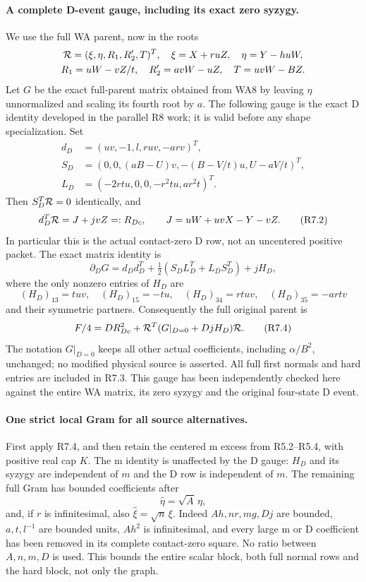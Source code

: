 \paragraph{A complete D-event gauge, including its exact zero syzygy.}
We use the full WA parent, now in the roots
\[
\begin{gathered}
 {\cal R}=(\xi,\eta,R_1,R'_2,T)^T,
 \quad\xi=X+ruZ,\quad\eta=Y-huW,\\
 R_1=uW-vZ/t,\quad R'_2=avW-uZ,\quad T=uvW-BZ.
\end{gathered}
\]
Let $G$ be the exact full-parent matrix obtained from WA8 by leaving
$\eta$ unnormalized and scaling its fourth root by $a$.
The following gauge is the exact D identity developed in the parallel
R8 work; it is valid before any shape specialization. Set
\[
\begin{split}
 d_D&=(uv,-1,l,ruv,-arv)^T,\\
 S_D&=(0,0,(aB-U)v,-(B-V/t)u,U-aV/t)^T,\\
 L_D&=(-2rtu,0,0,-r^2tu,ar^2t)^T.
\end{split}
\]
Then $S_D^T{\cal R}=0$ identically, and
\[
 d_D^T{\cal R}=J+jvZ=:R_{Dc},\qquad
 J=uW+uvX-Y-vZ.                                     \tag{R7.2}
\]
In particular this is the actual contact-zero D row, not an uncentered
positive packet. The exact matrix identity is
\[
 \partial_DG=d_Dd_D^T+\tfrac12(S_DL_D^T+L_DS_D^T)+jH_D,\tag{R7.3}
\]
where the only nonzero entries of $H_D$ are
\[
 (H_D)_{13}=tuv,\quad(H_D)_{15}=-tu,\quad
 (H_D)_{34}=rtuv,\quad(H_D)_{35}=-artv
\]
and their symmetric partners. Consequently the full original parent is
\[
 F/4=D R_{Dc}^2+{\cal R}^T(G|_{D=0}+DjH_D){\cal R}. \tag{R7.4}
\]
The notation $G|_{D=0}$ keeps all other actual coefficients, including
$\alpha/B^2$, unchanged; no modified physical source is asserted.
All full first normals and hard entries are included in R7.3.
This gauge has been independently checked here against the entire WA
matrix, its zero syzygy and the original four-state D event.

\paragraph{One strict local Gram for all source alternatives.}
First apply R7.4, and then retain the centered m excess from R5.2--R5.4,
with positive real cap $K$. The m identity is unaffected by the D gauge:
$H_D$ and its syzygy are independent of $m$ and the D row is independent
of $m$. The remaining full Gram has bounded coefficients after
\[
 \widehat\eta=\sqrt A\,\eta,
\]
and, if $r$ is infinitesimal, also $\widehat\xi=\sqrt n\,\xi$.
Indeed $Ah,nr,mg,Dj$ are bounded, $a,t,l^{-1}$ are bounded units,
$Ah^2$ is infinitesimal, and every large m or D coefficient has been
removed in its complete contact-zero square. No ratio between $A,n,m,D$
is used. This bounds the entire scalar block, both full normal rows and
the hard block, not only the graph.

